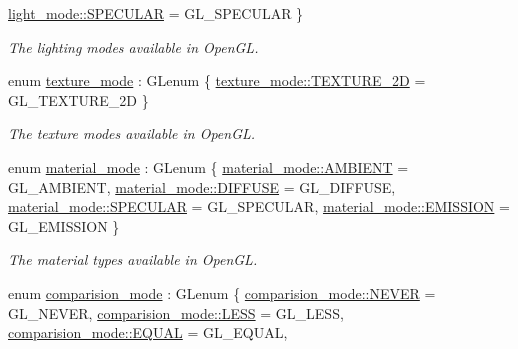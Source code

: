 \begin{DoxyCompactItemize}
\hyperlink{namespaceglpp_a8dc751394a1cf6601ba24c90da01f3a9a0df54c320628149300093da5e2ff693d}{light\+\_\+mode\+::\+S\+P\+E\+C\+U\+L\+AR} = G\+L\+\_\+\+S\+P\+E\+C\+U\+L\+AR
 \}\begin{DoxyCompactList}\small\item\em The lighting modes available in Open\+GL. \end{DoxyCompactList}
\item 
enum \hyperlink{namespaceglpp_a09dd2630cf15f1c3f3b4164c59cc7d26}{texture\+\_\+mode} \+: G\+Lenum \{ \hyperlink{namespaceglpp_a09dd2630cf15f1c3f3b4164c59cc7d26acc301ce75e16247f3b96a3907519096c}{texture\+\_\+mode\+::\+T\+E\+X\+T\+U\+R\+E\+\_\+2D} = G\+L\+\_\+\+T\+E\+X\+T\+U\+R\+E\+\_\+2D
 \}\begin{DoxyCompactList}\small\item\em The texture modes available in Open\+GL. \end{DoxyCompactList}
\item 
enum \hyperlink{namespaceglpp_a22c1a014f4ca14e1aa6b91f855910573}{material\+\_\+mode} \+: G\+Lenum \{ \hyperlink{namespaceglpp_a22c1a014f4ca14e1aa6b91f855910573ae2efd91581bab719d6c67ea43d1afd9b}{material\+\_\+mode\+::\+A\+M\+B\+I\+E\+NT} = G\+L\+\_\+\+A\+M\+B\+I\+E\+NT, 
\hyperlink{namespaceglpp_a22c1a014f4ca14e1aa6b91f855910573a84a9d8c4d046cae1f87af62f45f07e68}{material\+\_\+mode\+::\+D\+I\+F\+F\+U\+SE} = G\+L\+\_\+\+D\+I\+F\+F\+U\+SE, 
\hyperlink{namespaceglpp_a22c1a014f4ca14e1aa6b91f855910573a0df54c320628149300093da5e2ff693d}{material\+\_\+mode\+::\+S\+P\+E\+C\+U\+L\+AR} = G\+L\+\_\+\+S\+P\+E\+C\+U\+L\+AR, 
\hyperlink{namespaceglpp_a22c1a014f4ca14e1aa6b91f855910573a22ad2fbf2a5f5f4194e337f0f86fd8d3}{material\+\_\+mode\+::\+E\+M\+I\+S\+S\+I\+ON} = G\+L\+\_\+\+E\+M\+I\+S\+S\+I\+ON
 \}\begin{DoxyCompactList}\small\item\em The material types available in Open\+GL. \end{DoxyCompactList}
\item 
enum \hyperlink{namespaceglpp_aa44c8e6b80225228552f747c73ba7186}{comparision\+\_\+mode} \+: G\+Lenum \{ \newline
\hyperlink{namespaceglpp_aa44c8e6b80225228552f747c73ba7186a443475558f0168dff92ecde26b98ae5a}{comparision\+\_\+mode\+::\+N\+E\+V\+ER} = G\+L\+\_\+\+N\+E\+V\+ER, 
\hyperlink{namespaceglpp_aa44c8e6b80225228552f747c73ba7186a1798e8c3621ca53d9e3a80d257306000}{comparision\+\_\+mode\+::\+L\+E\+SS} = G\+L\+\_\+\+L\+E\+SS, 
\hyperlink{namespaceglpp_aa44c8e6b80225228552f747c73ba7186a969f331a87d8c958473c32b4d0e61a44}{comparision\+\_\+mode\+::\+E\+Q\+U\+AL} = G\+L\+\_\+\+E\+Q\+U\+AL, 

\end{DoxyCompactItemize}
